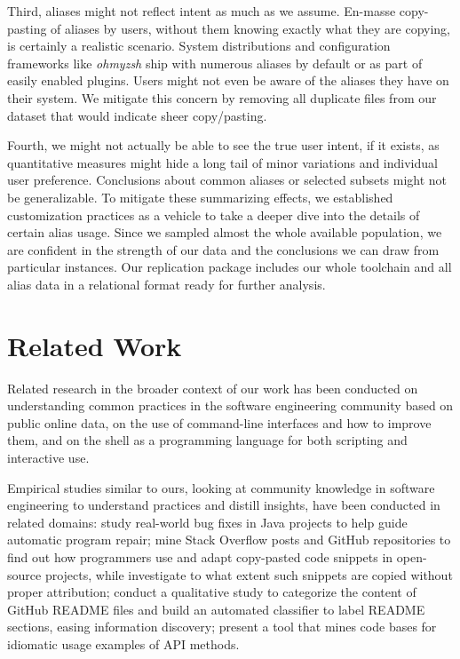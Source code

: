\documentclass[smallextended,natbib]{svjour3}
\begin{document}
Third, aliases might not reflect intent as much as we assume.
En-masse copy-pasting of aliases by users, without them knowing exactly what they are copying, is certainly a realistic scenario.
System distributions and configuration frameworks like \emph{ohmyzsh} ship with numerous aliases by default or as part of easily enabled plugins.
Users might not even be aware of the aliases they have on their system.
We mitigate this concern by removing all duplicate files from our dataset that would indicate sheer copy/pasting.

Fourth, we might not actually be able to see the true user intent, if it exists, as quantitative measures might hide a long tail of minor variations and individual user preference.
Conclusions about common aliases or selected subsets might not be generalizable.
To mitigate these summarizing effects, we established customization practices as a vehicle to take a deeper dive into the details of certain alias usage.
Since we sampled almost the whole available population, we are confident in the strength of our data and the conclusions we can draw from particular instances.
Our replication package includes our whole toolchain and all alias data in a relational format ready for further analysis.

\section{Related Work}

Related research in the broader context of our work has been conducted on understanding common practices in the software engineering community based on public online data, on the use of command-line interfaces and how to improve them, and on the shell as a programming language for both scripting and interactive use.

Empirical studies similar to ours, looking at community knowledge in software engineering to understand practices and distill insights, have been conducted in related domains:
\cite{zhong:15} study real-world bug fixes in Java projects to help guide automatic program repair;
\cite{yang:17} mine Stack Overflow posts and GitHub repositories to find out how programmers use and adapt copy-pasted code snippets in open-source projects, while \cite{baltes:19} investigate to what extent such snippets are copied without proper attribution;
\cite{prana:19} conduct a qualitative study to categorize the content of GitHub README files and build an automated classifier to label README sections, easing information discovery;
\cite{barnaby:20} present a tool that mines code bases for idiomatic usage examples of API methods.
\end{document}

